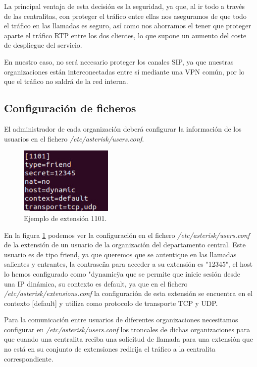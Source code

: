 \documentclass[a4paper]{article}
\begin{document}
 
La principal ventaja de esta decisión es la seguridad, ya que, al ir todo a través de las centralitas, con proteger el tráfico entre ellas nos aseguramos de que todo el tráfico en las llamadas es seguro, así como nos ahorramos el tener que proteger aparte el tráfico RTP entre los dos clientes, lo que supone un aumento del coste de despliegue del servicio. 


 En nuestro caso, no será necesario proteger los canales SIP, ya que nuestras organizaciones están interconectadas entre sí mediante una VPN común, por lo que el tráfico no saldrá de la red interna.

\subsection{Configuración de ficheros}
El administrador de cada organización deberá configurar la información de los usuarios en el fichero \textit{/etc/asterisk/users.conf}. 


\begin{figure}[htb]
    
    \begin{center}
        \includegraphics[width=0.4\textwidth]{1101.jpg}
         \caption{Ejemplo de extensión 1101.}
         \label{fig:1101}
    \end{center}
\end{figure}

\newpage
 En la figura \ref{fig:1101} podemos ver la configuración en el fichero \textit{/etc/asterisk/users.conf} de la extensión de un usuario de la organización del departamento central. Este usuario es de tipo friend, ya que queremos que se autentique en las llamadas salientes y entrantes, la contraseña para acceder a su extensión es "12345", el host lo hemos configurado como "dynamic\" ya que se permite que inicie sesión desde una IP dinámica, su contexto es default, ya que en el fichero \textit{/etc/asterisk/extensions.conf} la configuración de esta extensión se encuentra en el contexto [default] y utiliza como protocolo de transporte TCP y UDP.


 Para la comunicación entre usuarios de diferentes organizaciones necesitamos configurar en \textit{/etc/asterisk/users.conf} los troncales de dichas organizaciones para que cuando una centralita reciba una solicitud de llamada para una extensión que no está en su conjunto de extensiones redirija el tráfico a la centralita correspondiente. 
\end{document}
